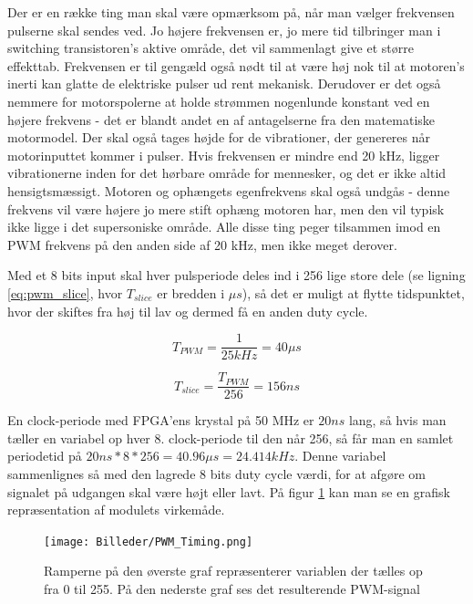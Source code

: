 Der er en række ting man skal være opmærksom på, når man vælger frekvensen pulserne skal sendes ved. Jo højere frekvensen er, jo mere tid tilbringer man i switching transistoren's aktive område, det vil sammenlagt give et større effekttab. Frekvensen er til gengæld også nødt til at være høj nok til at motoren's inerti kan glatte de elektriske pulser ud rent mekanisk. Derudover er det også nemmere for motorspolerne at holde strømmen nogenlunde konstant ved en højere frekvens - det er blandt andet en af antagelserne fra den matematiske motormodel. Der skal også tages højde for de vibrationer, der genereres når motorinputtet kommer i pulser. Hvis frekvensen er mindre end 20 kHz, ligger vibrationerne inden for det hørbare område for mennesker, og det er ikke altid hensigtsmæssigt. Motoren og ophængets egenfrekvens skal også undgås - denne frekvens vil være højere jo mere stift ophæng motoren har, men den vil typisk ikke ligge i det supersoniske område. Alle disse ting peger tilsammen imod en PWM frekvens på den anden side af 20 kHz, men ikke meget derover. 

Med et 8 bits input skal hver pulsperiode deles ind i 256 lige store dele (se ligning \ref{eq:pwm_slice}, hvor $T_{slice}$ er bredden i $\mu s$), så det er muligt at flytte tidspunktet, hvor der skiftes fra høj til lav og dermed få en anden duty cycle. 

\begin{equation}\label{eq:pwm_period}
T_{PWM}=\dfrac{1}{25 kHz} = 40 \mu s
\end{equation}

\begin{equation}\label{eq:pwm_slice}
T_{slice}=\dfrac{T_{PWM}}{256}=156ns
\end{equation}

En clock-periode med FPGA'ens krystal på 50 MHz er $20ns$ lang, så hvis man tæller en variabel op hver 8. clock-periode til den når 256, så får man en samlet periodetid på $20ns*8*256=40.96 \mu s=24.414kHz$. Denne variabel sammenlignes så med den lagrede 8 bits duty cycle værdi, for at afgøre om signalet på udgangen skal være højt eller lavt. På figur \ref{fig:PWM_timing} kan man se en grafisk repræsentation af modulets virkemåde.

\begin{figure}[ht]
	\begin{center}
		\texttt{[image: Billeder/PWM\_Timing.png]}
	\end{center}
\caption{Ramperne på den øverste graf repræsenterer variablen der tælles op fra 0 til 255. På den nederste graf ses det resulterende PWM-signal}
\label{fig:PWM_timing}
\end{figure}

